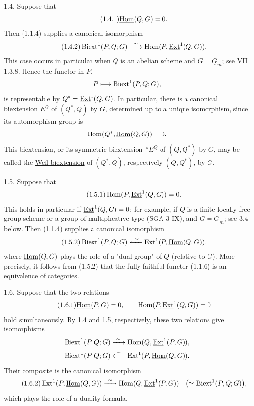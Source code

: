 1.4. Suppose that
\begin{equation}\tag{1.4.1}
 \uHom(Q,G)=0.
\end{equation}
Then (1.1.4) supplies a canonical isomorphism
\begin{equation}\tag{1.4.2}
 \Biext^1(P,Q;G)
 \xrightarrow{\ \sim\ }
 \Hom(P,\uExt^1(Q,G)).
\end{equation}
This case occurs in particular when $Q$ is an abelian scheme and
$G=\underline G_m$; see VII 1.3.8.  Hence the functor in $P$,
\[
 P\longmapsto\operatorname{Biext}^1(P,Q;G),
\]
is \underline{representable} by $Q^*=\uExt^1(Q,G)$.  In particular,
there is a canonical biextension $E^Q$ of $(Q^*,Q)$ by $G$, determined
up to a unique isomorphism, since its automorphism group is
\[
 \Hom(Q^*,\uHom(Q,G))=0.
\]
This biextension, or its symmetric biextension $\,{}^sE^Q$ of
$(Q,Q^*)$ by $G$, may be called the \underline{Weil biextension} of
$(Q^*,Q)$, respectively $(Q,Q^*)$, by $G$.

1.5. Suppose that
\begin{equation}\tag{1.5.1}
 \Hom(P,\uExt^1(Q,G))=0.
\end{equation}
This holds in particular if $\uExt^1(Q,G)=0$; for example, if $Q$ is
a finite locally free group scheme or a group of multiplicative type
(SGA 3 IX), and $G=\underline G_m$; see 3.4 below.  Then (1.1.4)
supplies a canonical isomorphism
\begin{equation}\tag{1.5.2}
 \Biext^1(P,Q;G)
 \xleftarrow{\ \sim\ }
 \Ext^1(P,\uHom(Q,G)),
\end{equation}
where $\uHom(Q,G)$ plays the role of a "dual group" of $Q$ (relative
to $G$).  More precisely, it follows from (1.5.2) that the fully
faithful functor (1.1.6) is an \underline{equivalence of categories}.

1.6. Suppose that the two relations
\begin{equation}\tag{1.6.1}
 \uHom(P,G)=0,\qquad
 \Hom(P,\uExt^1(Q,G))=0
\end{equation}
hold simultaneously.  By 1.4 and 1.5, respectively, these two
relations give isomorphisms
\[
 \Biext^1(P,Q;G)
 \xrightarrow{\ \sim\ }
 \Hom(Q,\uExt^1(P,G)),
\]
\[
 \Biext^1(P,Q;G)
 \xleftarrow{\ \sim\ }
 \Ext^1(P,\uHom(Q,G)).
\]
Their composite is the canonical isomorphism
\begin{equation}\tag{1.6.2}
 \Ext^1(P,\uHom(Q,G))
 \xrightarrow{\ \sim\ }
 \Hom(Q,\uExt^1(P,G))
 \quad\bigl(\simeq\Biext^1(P,Q;G)\bigr),
\end{equation}
which plays the role of a duality formula.

